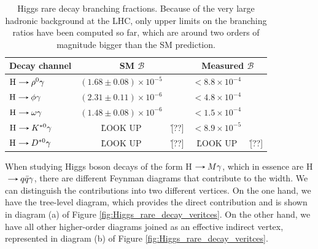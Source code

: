 \begin{table}[!ht]
    \centering
    \begin{tabular}{|l|cc|cc|}
        \hline
        \multicolumn{1}{|c|}{\cellcolor{lightgray}Decay channel} & \multicolumn{2}{c|}{\cellcolor{lightgray} SM $\mathcal{B}$} & \multicolumn{2}{c|}{\cellcolor{lightgray} Measured $\mathcal{B}$} \\ \hline
        $\text{H}\decaysto \rho^0\gamma$    & $(1.68 \pm 0.08)\times 10^{-5}$    & \cite{Konig:2015qat} & $< 8.8 \times 10^{-4}$ & \cite{ATLAS:2017gko}  \\
        $\text{H}\decaysto \phi\gamma$      & $(2.31 \pm 0.11)\times 10^{-6}$    & \cite{Konig:2015qat} & $< 4.8 \times 10^{-4}$ & \cite{ATLAS:2017gko}  \\
        $\text{H}\decaysto \omega\gamma$    & $(1.48 \pm 0.08)\times 10^{-6}$    & \cite{Konig:2015qat} & $< 1.5 \times 10^{-4}$ & \cite{ATLAS:2023alf}  \\
        $\text{H}\decaysto K^{*0}\gamma$    & \r LOOK UP & \r [??]              & $< 8.9 \times 10^{-5}$ & \cite{ATLAS:2023alf}  \\
        $\text{H}\decaysto D^{*0}\gamma$    & \r LOOK UP & \r [??]              & \r LOOK UP & \r [??]  \\ \hline
    \end{tabular}
    \caption{Higgs rare decay branching fractions. Because of the very large hadronic background at the LHC, only upper limits on the branching ratios have been computed so far, which are around two orders of magnitude bigger than the SM prediction.}
    \label{tab:Higgs_rare_decays_values}
\end{table}

When studying Higgs boson decays of the form H$\decaysto M\gamma$, which in essence are H$\decaysto q\bar{q}\gamma$, there are different Feynman diagrams that contribute to the width. We can distinguish the contributions into two different vertices. On the one hand, we have the tree-level diagram, which provides the direct contribution and is shown in diagram (a) of Figure \ref{fig:Higgs_rare_decay_veritces}. On the other hand, we have all other higher-order diagrams joined as an effective indirect vertex, represented in diagram (b) of Figure \ref{fig:Higgs_rare_decay_veritces}.

